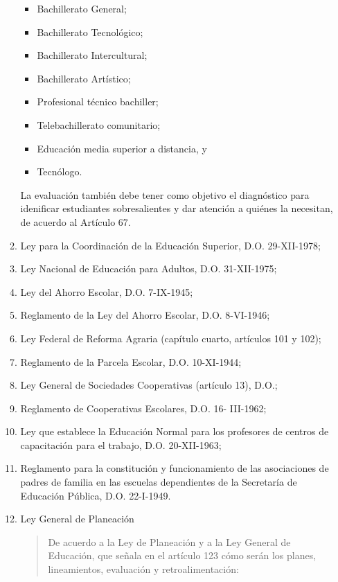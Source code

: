 \documentclass[
  12,
]{scrartcl}
\providecommand{\tightlist}{%
  \setlength{\itemsep}{0pt}\setlength{\parskip}{0pt}}
\begin{document}
\begin{enumerate}
\begin{enumerate}
    \begin{itemize}
    \tightlist
    \item
      Bachillerato General;
    \item
      Bachillerato Tecnológico;
    \item
      Bachillerato Intercultural;
    \item
      Bachillerato Artístico;
    \item
      Profesional técnico bachiller;
    \item
      Telebachillerato comunitario;
    \item
      Educación media superior a distancia, y
    \item
      Tecnólogo.
    \end{itemize}

    La evaluación también debe tener como objetivo el diagnóstico para
    idenificar estudiantes sobresalientes y dar atención a quiénes la
    necesitan, de acuerdo al Artículo 67.
  \item
    Ley para la Coordinación de la Educación Superior, D.O. 29-XII-1978;
  \item
    Ley Nacional de Educación para Adultos, D.O. 31-XII-1975;
  \item
    Ley del Ahorro Escolar, D.O. 7-IX-1945;
  \item
    Reglamento de la Ley del Ahorro Escolar, D.O. 8-VI-1946;
  \item
    Ley Federal de Reforma Agraria (capítulo cuarto, artículos 101 y
    102);
  \item
    Reglamento de la Parcela Escolar, D.O. 10-XI-1944;
  \item
    Ley General de Sociedades Cooperativas (artículo 13), D.O.;
  \item
    Reglamento de Cooperativas Escolares, D.O. 16- III-1962;
  \item
    Ley que establece la Educación Normal para los profesores de centros
    de capacitación para el trabajo, D.O. 20-XII-1963;
  \item
    Reglamento para la constitución y funcionamiento de las asociaciones
    de padres de familia en las escuelas dependientes de la Secretaría
    de Educación Pública, D.O. 22-I-1949.
  \item
    Ley General de Planeación

    \begin{quote}
    De acuerdo a la Ley de Planeación y a la Ley General de Educación,
    que señala en el artículo 123 cómo serán los planes, lineamientos,
    evaluación y retroalimentación:


\end{quote}
\end{enumerate}
\end{enumerate}
\end{document}
